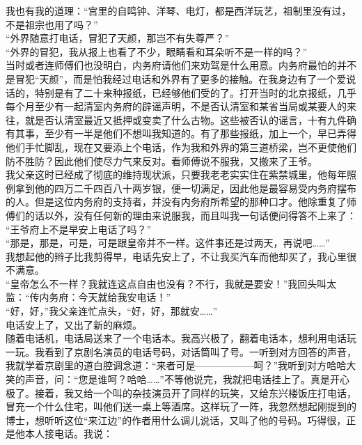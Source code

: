 我也有我的道理：“宫里的自鸣钟、洋琴、电灯，都是西洋玩艺，祖制里没有过，不是祖宗也用了吗？”\\

“外界随意打电话，冒犯了天颜，那岂不有失尊严？”\\

“外界的冒犯，我从报上也看了不少，眼睛看和耳朵听不是一样的吗？”\\

当时或者连师傅们也没明白，内务府请他们来劝驾是什么用意。内务府最怕的并不是冒犯“天颜”，而是怕我经过电话和外界有了更多的接触。在我身边有了一个爱说话的，特别是有了二十来种报纸，已经够他们受的了。打开当时的北京报纸，几乎每个月至少有一起清室内务府的辟谣声明，不是否认清室和某省当局或某要人的来往，就是否认清室最近又抵押或变卖了什么古物。这些被否认的谣言，十有九件确有其事，至少有一半是他们不想叫我知道的。有了那些报纸，加上一个，早已弄得他们手忙脚乱，现在又要添上个电话，作为我和外界的第三道桥梁，岂不更使他们防不胜防？因此他们使尽力气来反对。看师傅说不服我，又搬来了王爷。\\

我父亲这时已经成了彻底的维持现状派，只要我老老实实住在紫禁城里，他每年照例拿到他的四万二千四百八十两岁银，便一切满足，因此他是最容易受内务府摆布的人。但是这位内务府的支持者，并没有内务府所希望的那种口才。他除重复了师傅们的话以外，没有任何新的理由来说服我，而且叫我一句话便问得答不上来了：\\

“王爷府上不是早安上电话了吗？”\\

“那是，那是，可是，可是跟皇帝并不一样。这件事还是过两天，再说吧……”\\

我想起他的辫子比我剪得早，电话先安上了，不让我买汽车而他却买了，我心里很不满意。\\

“皇帝怎么不一样？我就连这点自由也没有？不行，我就是要安！”我回头叫太监：“传内务府：今天就给我安电话！”\\

“好，好，”我父亲连忙点头，“好，好，那就安……”\\

电话安上了，又出了新的麻烦。\\

随着电话机，电话局送来了一个电话本。我高兴极了，翻着电话本，想利用电话玩一玩。我看到了京剧名演员的电话号码，对话筒叫了号。一听到对方回答的声音，我就学着京剧里的道白腔调念道：“来者可是——————呵？”我听到对方哈哈大笑的声音，问：“您是谁呵？哈哈……”不等他说完，我就把电话挂上了。真是开心极了。接着，我又给一个叫的杂技演员开了同样的玩笑，又给东兴楼饭庄打电话，冒充一个什么住宅，叫他们送一桌上等酒席。这样玩了一阵，我忽然想起刚提到的博士，想听听这位“来江边”的作者用什么调儿说话，又叫了他的号码。巧得很，正是他本人接电话。我说：\\

